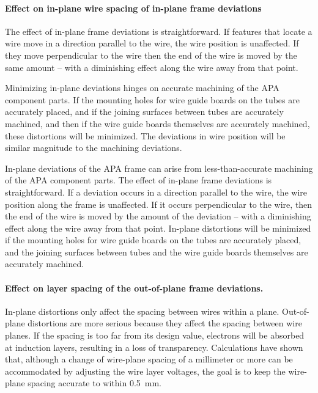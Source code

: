 \paragraph{Effect on in-plane wire spacing of in-plane frame deviations}

The effect of in-plane frame deviations is straightforward.  If features that locate a wire move in a direction parallel to the wire, the wire position is unaffected. If they move perpendicular to the wire then the end of the wire is moved by the same amount -- with a diminishing effect along the wire away from that point. 

Minimizing in-plane deviations hinges on accurate machining of the APA component parts.  If the mounting holes for wire guide boards on the tubes are accurately placed, and if the joining surfaces between tubes are accurately machined, and then if the wire guide boards themselves are accurately machined, these distortions will be minimized.  The deviations in wire position will be similar magnitude to the machining deviations.

In-plane deviations of the APA frame can arise from less-than-accurate machining of the APA component parts. The effect of in-plane frame deviations is straightforward.  If a deviation occurs in a direction parallel to the wire, the wire position along the frame is unaffected. If it occurs perpendicular to the wire, then the end of the wire is moved by the amount of the deviation -- with a diminishing effect along the wire away from that point.  In-plane distortions will be minimized if the mounting holes for wire guide boards on the tubes are accurately placed, and the joining surfaces between tubes and the wire guide boards themselves are accurately machined.


\paragraph{Effect on layer spacing of the out-of-plane frame deviations.}

In-plane distortions only affect the spacing between wires within a plane.  Out-of-plane distortions are more serious because they affect the spacing between wire planes.  If the spacing is too far from its design value, electrons will be absorbed at induction layers, resulting in a loss of transparency.  Calculations have shown that, %
although a change of %
wire-plane spacing of a millimeter or more can be accommodated by
 adjusting the wire layer voltages, the goal is to keep the wire-plane spacing accurate to within 0.5~mm. 

